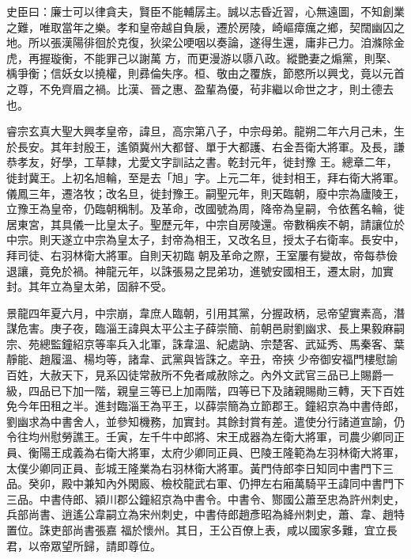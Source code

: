 \begin{pinyinscope}
 史臣曰：廉士可以律貪夫，賢臣不能輔孱主。誠以志昏近習，心無遠圖，不知創業之難，唯取當年之樂。孝和皇帝越自負扆，遷於房陵，崎嶇瘴癘之鄉，契闊幽囚之地。所以張漢陽徘徊於克復，狄梁公哽咽以奏論，遂得生還，庸非己力。洎滌除金虎，再握璇衡，不能罪己以謝萬
 方，而更漫游以隳八政。縱艷妻之煽黨，則棸、楀爭衡；信妖女以撓權，則彞倫失序。桓、敬由之覆族，節愍所以興戈，竟以元首之尊，不免齊眉之禍。比漢、晉之惠、盈輩為優，茍非繼以命世之才，則土德去也。



 睿宗玄真大聖大興孝皇帝，諱旦，高宗第八子，中宗母弟。龍朔二年六月己未，生於長安。其年封殷王，遙領冀州大都督、單于大都護、右金吾衛大將軍。及長，謙恭孝友，好學，工草隸，尤愛文字訓詁之書。乾封元年，徙封豫
 王。總章二年，徙封冀王。上初名旭輪，至是去「旭」字。上元二年，徙封相王，拜右衛大將軍。儀鳳三年，遷洛牧；改名旦，徙封豫王。嗣聖元年，則天臨朝，廢中宗為廬陵王，立豫王為皇帝，仍臨朝稱制。及革命，改國號為周，降帝為皇嗣，令依舊名輪，徙居東宮，其具儀一比皇太子。聖歷元年，中宗自房陵還。帝數稱疾不朝，請讓位於中宗。則天遂立中宗為皇太子，封帝為相王，又改名旦，授太子右衛率。長安中，拜司徒、右羽林衛大將軍。自則天初臨
 朝及革命之際，王室屢有變故，帝每恭儉退讓，竟免於禍。神龍元年，以誅張易之昆弟功，進號安國相王，遷太尉，加實封。其年立為皇太弟，固辭不受。



 景龍四年夏六月，中宗崩，韋庶人臨朝，引用其黨，分握政柄，忌帝望實素高，潛謀危害。庚子夜，臨淄王諱與太平公主子薛崇簡、前朝邑尉劉幽求、長上果毅麻嗣宗、苑總監鐘紹京等率兵入北軍，誅韋溫、紀處訥、宗楚客、武延秀、馬秦客、葉靜能、趙履溫、楊均等，諸韋、武黨與皆誅之。辛丑，帝挾
 少帝御安福門樓慰諭百姓，大赦天下，見系囚徒常赦所不免者咸赦除之。內外文武官三品已上賜爵一級，四品已下加一階，親皇三等已上加兩階，四等已下及諸親賜勛三轉，天下百姓免今年田租之半。進封臨淄王為平王，以薛崇簡為立節郡王。鐘紹京為中書侍郎，劉幽求為中書舍人，並參知機務，加實封。其餘封賞有差。遣使分行諸道宣諭，仍令往均州慰勞譙王。壬寅，左千牛中郎將、宋王成器為左衛大將軍，司農少卿同正
 員、衡陽王成義為右衛大將軍，太府少卿同正員、巴陵王隆範為左羽林衛大將軍，太僕少卿同正員、彭城王隆業為右羽林衛大將軍。黃門侍郎李日知同中書門下三品。癸卯，殿中兼知內外閑廄、檢校龍武右軍、仍押左右廂萬騎平王諱同中書門下三品。中書侍郎、潁川郡公鐘紹京為中書令。中書令、酂國公蕭至忠為許州刺史，兵部尚書、逍遙公韋嗣立為宋州刺史，中書侍郎趙彥昭為絳州刺史，蕭、韋、趙特置位。誅吏部尚書張嘉
 福於懷州。其日，王公百僚上表，咸以國家多難，宜立長君，以帝眾望所歸，請即尊位。




\end{pinyinscope}
